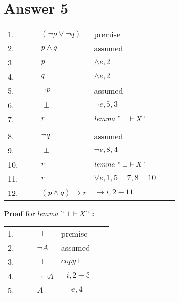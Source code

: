 \documentclass[12pt]{article}
\begin{document}
\section*{Answer 5}
\begin{table}[H]
	\centering
	\begin{tabular}{lllllll}
		1. & & & $(\neg p \vee \neg q)$ & premise & & \\ \cline{3-7}
		2. & \multicolumn{1}{c|}{} & & $p \wedge q$ & assumed & & \multicolumn{1}{c|}{} \\ 
		3. & \multicolumn{1}{c|}{} &  & $p$ & $\wedge e, 2$ &  & \multicolumn{1}{c|}{} \\
		4. & \multicolumn{1}{c|}{} &  & $q$ & $\wedge e, 2$ &  & \multicolumn{1}{c|}{} \\ \cline{4-6}
		5. & \multicolumn{1}{c|}{} & \multicolumn{1}{c|}{} & $\neg p$ & assumed & \multicolumn{1}{c|}{} & \multicolumn{1}{c|}{} \\ 
		6. & \multicolumn{1}{c|}{} & \multicolumn{1}{c|}{} & $\perp$ & $\neg e, 5, 3$ & \multicolumn{1}{c|}{} & \multicolumn{1}{c|}{} \\ 
		7. & \multicolumn{1}{c|}{} & \multicolumn{1}{c|}{} & $r$ & $lemma \ "\perp  \ \vdash X"$ & \multicolumn{1}{c|}{} & \multicolumn{1}{c|}{} \\ \cline{4-6}
		& \multicolumn{1}{c|}{} &  &  &  &  & \multicolumn{1}{c|}{} \\ \cline{4-6}
		8. & \multicolumn{1}{c|}{} & \multicolumn{1}{c|}{} & $\neg q$ & assumed & \multicolumn{1}{c|}{} & \multicolumn{1}{c|}{} \\
		9. & \multicolumn{1}{c|}{} & \multicolumn{1}{c|}{} & $\perp$ & $\neg e, 8, 4$ & \multicolumn{1}{c|}{} & \multicolumn{1}{c|}{} \\
		10. & \multicolumn{1}{c|}{} & \multicolumn{1}{c|}{} & $r$ & $lemma \ "\perp  \ \vdash X"$ & \multicolumn{1}{c|}{} & \multicolumn{1}{c|}{} \\ \cline{4-6}
		11. & \multicolumn{1}{c|}{} & & $r$ & $\vee e, 1, 5-7, 8-10$ & & \multicolumn{1}{c|}{} \\ \cline{3-7}
		12. & & & $(p \wedge q) \rightarrow r$ & $\rightarrow i, 2-11$ & & \\
		
	\end{tabular}
\end{table}

\textbf{Proof for $lemma \ "\perp  \ \vdash X"$ :} \\
\begin{table}[H]
	\centering
	\begin{tabular}{lllllll}
		1. & & & $\perp$ & premise & & \\ \cline{3-7}
		2. & \multicolumn{1}{c|}{} & & $\neg A$ & assumed & & \multicolumn{1}{c|}{} \\ 
		3. & \multicolumn{1}{c|}{} &  & $\perp$ & $copy 1$ &  & \multicolumn{1}{c|}{} \\ \cline{3-7}
		4. &  &  & $\neg \neg A$ & $\neg i, 2-3$ &  & \\ 
		5. &  &  & $A$ & $\neg \neg e, 4$ &  &  \\ 
		
	\end{tabular}
\end{table}
\end{document}
